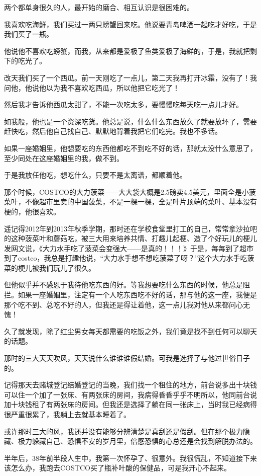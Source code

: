 \documentclass[9pt, b5paper]{article}
\begin{document}
两个都单身很久的人，最开始的磨合、相互认识是很困难的。

我喜欢吃海鲜，我们买过一两只螃蟹回来吃。他说要青岛啤酒一起吃才好吃，于是我们买了一瓶。

他说他不喜欢吃螃蟹，而我，从来都是爱极了鱼类爱极了海鲜的，于是，我就把剩下的吃光了。

改天我们买了一个西瓜。前一天刚吃了一点儿，第二天我再打开冰霜，没有了！我问他，他说他以为我不喜欢吃西瓜，所以他把它吃光了！

然后我才告诉他西瓜太甜了，不能一次吃太多，要慢慢吃每天吃一点儿才好。

如我般，他也是一个资深吃货。他总是说，什么什么东西放久了就要放坏了，需要赶快吃，然后他自己找自己、默默地背着我把它们吃完。我也不多话。

如果一座婚姻里，他想要吃的东西他都吃不到吃不好的话，那就太没什么意思了，至少同处在这座婚姻里的我，做不到。

于是我放任他吃，想吃什么，只要不是太离谱，都顺着他。

那个时候，COSTCO的大力菠菜——大大袋大概是2.5磅卖4.5美元，里面全是小菠菜叶，不像超市里卖的中国菠菜，不是一棵一棵，全是叶片顶端的菜叶、基本没有梗的，他很喜欢。

遥记得2012年到2013年秋季学期，那时还在学校食堂里打工的自己，常常拿沙拉吧的这种菠菜叶和蘑菇吃，被三大用来培养共情、打趣儿起梗、造了个好玩儿的梗儿发网文说，《大力水手吃了菠菜会变强大——是真的！！！》于是，每每到了超市到了costco，我总是打趣他说，“大力水手想不想吃菠菜了呀？”这个大力水手吃菠菜的梗儿被我们玩儿了很久。

但他似乎并不感恩于我待他吃东西的好。等我想要吃什么东西的时候，他总是阻拦。如果一座婚姻里，注定有一个人吃东西吃不好的话，那与他的这一座，我便是那个吃不到、总吃不好的人，但我还是得让着他，这一点儿我对他从来都问心无愧！

久了就发现，除了红尘男女每天都需要的吃饭之外，我们竟是找不到任何可以聊天的话题。

那时的三大天天吹风，天天说什么谁谁谁假结婚。可我是选择了与他过世俗日子的。

记得那天去赌城登记结婚登记的当晚，我们找一个租住的地方，前台说多出十块钱可以住一个加了一张床、有两张床的房间，我病得昏昏乎乎不明所以，他同前台说加十块钱租了有两张床的房间。但我还是选择了躺在同一张床上，当时我已经病得很严重很累了，我躺上去就基本睡着了。

或许那时三大的风，我还并没有能够分辨清楚是真刮还是假刮。但在那个极力隐藏、极力躲藏自己、恐惧不安的岁月里，倍感恐惧的心总还是会找到解脱办法的。

半年后，38年前半段人生中，我第一次怀孕了、很意外。我很慌乱，不知道接下来该怎么办，我跑去COSTCO买了瓶补叶酸的保健品，可是我开心不起来。
\end{document}
